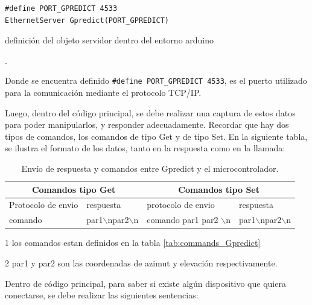 \begin{listing}[H]
	\begin{verbatim}
#define PORT_GPREDICT 4533 
EthernetServer Gpredict(PORT_GPREDICT)
	\end{verbatim}
\vspace{-10mm}
\caption{definición del objeto servidor dentro del entorno arduino}. 
\label{cod:obj_serv_gpr}
\end{listing}
\vspace{-5mm}
Donde se encuentra definido \texttt{#define PORT_GPREDICT 4533}, es el puerto utilizado para la comunicación mediante el protocolo TCP/IP.

Luego, dentro del código principal, se debe realizar una captura de estos datos para poder manipularlos, y responder adecuadamente. Recordar que hay dos tipos de comandos, los comandos de tipo Get y de tipo Set. En la siguiente tabla, se ilustra el formato de los datos, tanto en la respuesta como en la llamada: 
\begin{table}[H]
	\centering
	\vspace{-2mm}
 \begin{threeparttable}	
	\begin{tabular}{|p{3.0cm}|p{3.0cm}|p{3.5cm}|p{3.0cm}|} 
		\hline
		\multicolumn{2}{|c|}{Comandos tipo Get} &\multicolumn{2}{c|}{Comandos tipo Set}  
		\\ \hline 
		Protocolo de envio & respuesta & protocolo de envio & respuesta \\ \hline 
		comando\tnote{1} & par1$\backslash$npar2$\backslash$n & 
		comando\tnote{1} par1\tnote{2} par2\tnote{2}  $\backslash$n & par1$\backslash$npar2$\backslash$n  \\ 
		\hline 
	\end{tabular}
	\begin{tablenotes}
		\item [1] los comandos estan definidos en la tabla \ref{tab:commands_Gpredict}   
		\item [2] par1 y par2 son las coordenadas de azimut y elevación respectivamente.  
		
	\end{tablenotes}


\end{threeparttable}
	\caption{Envío de respuesta y comandos entre Gpredict y el microcontrolador.}
	\label{tab:protocol_tx_gpr}
\end{table}


Dentro de código principal, para saber si existe algún dispositivo que quiera conectarse, se debe realizar las siguientes sentencias: 

